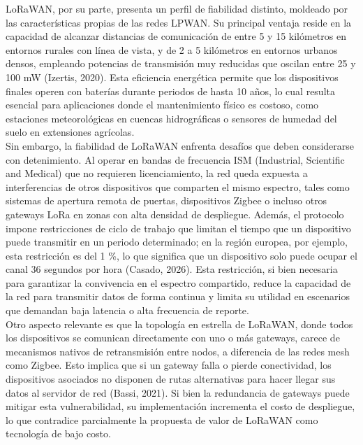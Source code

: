 \documentclass[12pt,a4paper]{article}
\begin{document}
	LoRaWAN, por su parte, presenta un perfil de fiabilidad distinto, moldeado por las características propias de las redes LPWAN. Su principal ventaja reside en la capacidad de alcanzar distancias de comunicación de entre 5 y 15 kilómetros en entornos rurales con línea de vista, y de 2 a 5 kilómetros en entornos urbanos densos, empleando potencias de transmisión muy reducidas que oscilan entre 25 y 100 mW (Izertis, 2020). Esta eficiencia energética permite que los dispositivos finales operen con baterías durante periodos de hasta 10 años, lo cual resulta esencial para aplicaciones donde el mantenimiento físico es costoso, como estaciones meteorológicas en cuencas hidrográficas o sensores de humedad del suelo en extensiones agrícolas.\\

	Sin embargo, la fiabilidad de LoRaWAN enfrenta desafíos que deben considerarse con detenimiento. Al operar en bandas de frecuencia ISM (Industrial, Scientific and Medical) que no requieren licenciamiento, la red queda expuesta a interferencias de otros dispositivos que comparten el mismo espectro, tales como sistemas de apertura remota de puertas, dispositivos Zigbee o incluso otros gateways LoRa en zonas con alta densidad de despliegue. Además, el protocolo impone restricciones de ciclo de trabajo que limitan el tiempo que un dispositivo puede transmitir en un periodo determinado; en la región europea, por ejemplo, esta restricción es del 1 \%, lo que significa que un dispositivo solo puede ocupar el canal 36 segundos por hora (Casado, 2026). Esta restricción, si bien necesaria para garantizar la convivencia en el espectro compartido, reduce la capacidad de la red para transmitir datos de forma continua y limita su utilidad en escenarios que demandan baja latencia o alta frecuencia de reporte.\\

	Otro aspecto relevante es que la topología en estrella de LoRaWAN, donde todos los dispositivos se comunican directamente con uno o más gateways, carece de mecanismos nativos de retransmisión entre nodos, a diferencia de las redes mesh como Zigbee. Esto implica que si un gateway falla o pierde conectividad, los dispositivos asociados no disponen de rutas alternativas para hacer llegar sus datos al servidor de red (Bassi, 2021). Si bien la redundancia de gateways puede mitigar esta vulnerabilidad, su implementación incrementa el costo de despliegue, lo que contradice parcialmente la propuesta de valor de LoRaWAN como tecnología de bajo costo.\\
\end{document}

